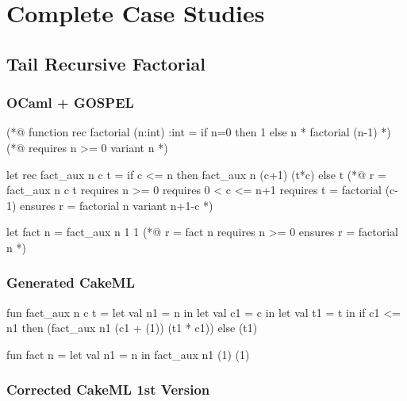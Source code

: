 
%

\chapter{Complete Case Studies}
\label{app:appendix}

\section*{Tail Recursive Factorial}

\subsection*{OCaml + GOSPEL}

\begin{gospell}
(*@ 
  function rec factorial (n:int) :int = 
    if n=0 then 1 else n * factorial (n-1)
*)
(*@ 
  requires n >= 0
  variant n
*)

let rec fact_aux n c t =
  if c <= n then fact_aux n (c+1) (t*c) else t
(*@
  r = fact_aux n c t
  requires n >= 0
  requires 0 < c <= n+1
  requires t = factorial (c-1)
  ensures r = factorial n
  variant n+1-c
*)

let fact n = fact_aux n 1 1
(*@ 
  r = fact n
  requires n >= 0 
  ensures r = factorial n
*)
\end{gospell}

\newpage

\subsection*{Generated CakeML}

\begin{cakeml}
fun fact_aux n c t = let val n1 = n in
  let val c1 = c in
  let val t1 = t in
  if c1 <= n1 then (fact_aux n1 (c1 + (1)) (t1 * c1))  else (t1)

fun fact n = let val n1 = n in fact_aux n1 (1) (1)
\end{cakeml}

\subsection*{Corrected CakeML 1st Version}

